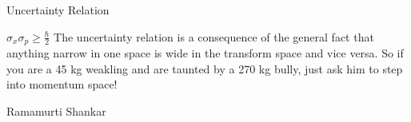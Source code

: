     \begin{frame}{Uncertainty Relation}
        \begin{block}{\centering$\sigma_x\sigma_p \geq \frac{\hbar}{2}$}
            The uncertainty relation is a consequence of the general fact that anything narrow in one space is wide in the transform space and vice versa. So if you are a 45 kg weakling and are taunted by a 270 kg bully, just ask him to step into momentum space!
        
            \alert{Ramamurti Shankar}
        \end{block}
    \end{frame}